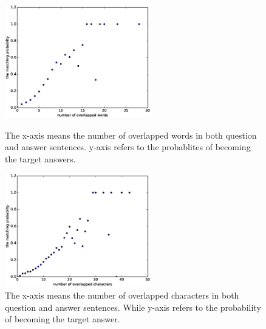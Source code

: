 \documentclass{llncs}
\begin{document}
\begin{figure}[htb]
	\begin{minipage}[t]{0.5\linewidth} 
	\subfigure
	\centering
		\includegraphics[width=2.5in]{figures/word_overlap.eps}
		\caption{The x-axis means the number of overlapped words in both question and answer sentences. y-axis refers to the probablites of  becoming the target answers. }
		\label{fig:word_overlap}
	\end{minipage}
	\hspace{1ex} 
	\begin{minipage}[t]{0.5\linewidth} 
	\subfigure
	\centering
		\includegraphics[width=2.5in]{figures/character_overlap.eps}
		\caption{The x-axis means the number of overlapped characters in both question and answer sentences. While y-axis refers to the probability of becoming the target answer.}
		\label{fig:character_overlap}
	\end{minipage}
\end{figure}

\end{document}
